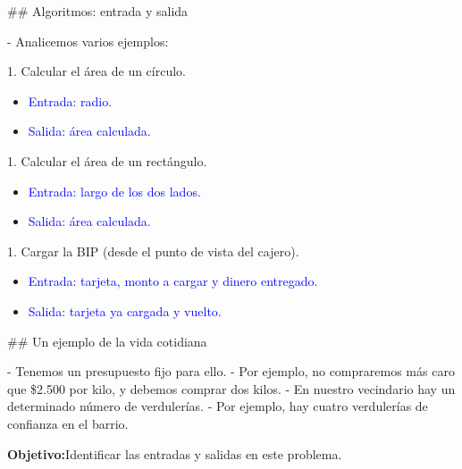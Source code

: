 ## Algoritmos: entrada y salida

- Analicemos varios ejemplos:

    1. Calcular el área de un círculo.
    
        \begin{itemize}
            \item <2-> \textcolor{blue}{Entrada: radio.}
            \item <2-> \textcolor{blue}{Salida: área calculada.}
        \end{itemize}
    1. Calcular el área de un rectángulo.
        \begin{itemize}
            \item <3-> \textcolor{blue}{Entrada: largo de los dos lados.}
            \item <3-> \textcolor{blue}{Salida: área calculada.}
        \end{itemize}
    1. Cargar la BIP (desde el punto de vista del cajero).
        \begin{itemize}
            \item <4-> \textcolor{blue}{Entrada: tarjeta, monto a cargar y dinero entregado.}
            \item <4-> \textcolor{blue}{Salida: tarjeta ya cargada y vuelto.}
        \end{itemize}

## Un ejemplo de la vida cotidiana


- Tenemos un presupuesto fijo para ello.
    - Por ejemplo, no compraremos más caro que \$2.500 por kilo, y debemos comprar dos kilos.
- En nuestro vecindario hay un determinado número de verdulerías.
    - Por ejemplo, hay cuatro verdulerías de confianza en el barrio.

\pause

\bgnblocknormal[wd=.9\textwidth,centered=true]
\textbf{Objetivo:}\newline Identificar las entradas y salidas en este problema.
\trmblocknormal
